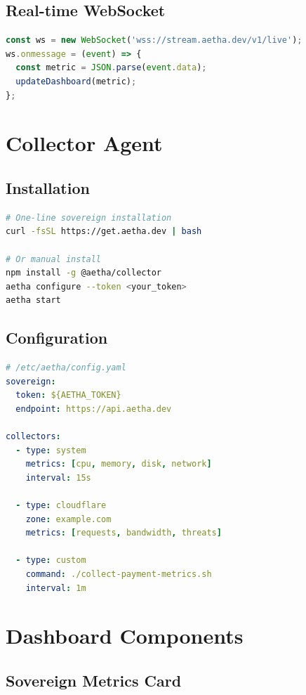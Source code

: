 \documentclass[12pt]{article}
\begin{document}
\subsection{Real-time WebSocket}

\begin{lstlisting}[language=JavaScript]
const ws = new WebSocket('wss://stream.aetha.dev/v1/live');
ws.onmessage = (event) => {
  const metric = JSON.parse(event.data);
  updateDashboard(metric);
};
\end{lstlisting}

\section{Collector Agent}

\subsection{Installation}

\begin{lstlisting}[language=bash]
# One-line sovereign installation
curl -fsSL https://get.aetha.dev | bash

# Or manual install
npm install -g @aetha/collector
aetha configure --token <your_token>
aetha start
\end{lstlisting}

\subsection{Configuration}

\begin{lstlisting}[language=yaml]
# /etc/aetha/config.yaml
sovereign:
  token: ${AETHA_TOKEN}
  endpoint: https://api.aetha.dev

collectors:
  - type: system
    metrics: [cpu, memory, disk, network]
    interval: 15s

  - type: cloudflare
    zone: example.com
    metrics: [requests, bandwidth, threats]

  - type: custom
    command: ./collect-payment-metrics.sh
    interval: 1m
\end{lstlisting}

\section{Dashboard Components}

\subsection{Sovereign Metrics Card}
\end{document}
